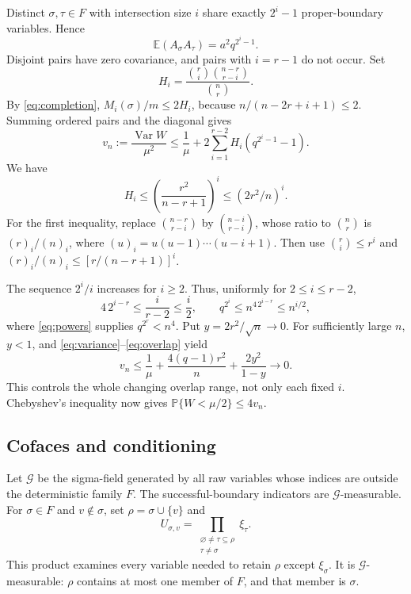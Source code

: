 \documentclass[11pt,a4paper]{article}
\newcommand{\E}{\mathbb E}
\newcommand{\Prob}{\mathbb P}
\newcommand{\Var}{\operatorname{Var}}
\begin{document}
Distinct $\sigma,\tau\in F$ with intersection size $i$ share exactly
$2^i-1$ proper-boundary variables. Hence
\[
\E(A_\sigma A_\tau)=a^2q^{2^i-1}.
\]
Disjoint pairs have zero covariance, and pairs with $i=r-1$ do not
occur. Set
\[
H_i=\frac{\binom ri\binom{n-r}{r-i}}{\binom nr}.
\]
By \eqref{eq:completion}, $M_i(\sigma)/m\le2H_i$, because
$n/(n-2r+i+1)\le2$. Summing ordered pairs and the diagonal gives
\begin{equation}\label{eq:variance}
v_n:=\frac{\Var W}{\mu^2}
\le\frac1\mu+2\sum_{i=1}^{r-2}H_i(q^{2^i-1}-1).
\end{equation}
We have
\begin{equation}\label{eq:overlap}
H_i\le\left(\frac{r^2}{n-r+1}\right)^i
\le(2r^2/n)^i.
\end{equation}
For the first inequality, replace $\binom{n-r}{r-i}$ by
$\binom{n-i}{r-i}$, whose ratio to $\binom nr$ is $(r)_i/(n)_i$,
where $(u)_i=u(u-1)\cdots(u-i+1)$. Then use
$\binom ri\le r^i$ and $(r)_i/(n)_i\le[r/(n-r+1)]^i$.

The sequence $2^i/i$ increases for $i\ge2$. Thus, uniformly for
$2\le i\le r-2$,
\[
4\,2^{i-r}\le\frac{i}{r-2}\le\frac i2,
\qquad q^{2^i}\le n^{4\,2^{i-r}}\le n^{i/2},
\]
where \eqref{eq:powers} supplies $q^{2^r}<n^4$.
Put $y=2r^2/\sqrt n\to0$. For sufficiently large $n$, $y<1$,
and \eqref{eq:variance}--\eqref{eq:overlap} yield
\begin{equation}\label{eq:smallvariance}
v_n\le\frac1\mu+\frac{4(q-1)r^2}{n}
+\frac{2y^2}{1-y}\longrightarrow0.
\end{equation}
This controls the whole changing overlap range, not only each fixed $i$.
Chebyshev's inequality now gives
$\Prob\{W<\mu/2\}\le4v_n$.

\subsection{Cofaces and conditioning}

Let $\mathcal G$ be the sigma-field generated by all raw variables whose indices are
outside the deterministic family $F$. The successful-boundary indicators
are $\mathcal G$-measurable. For $\sigma\in F$ and $v\notin\sigma$, set
$\rho=\sigma\cup\{v\}$ and
\[
U_{\sigma,v}
=\prod_{\substack{\varnothing\ne\tau\subseteq\rho\\\tau\ne\sigma}}\xi_\tau.
\]
This product examines every variable needed to retain $\rho$ except
$\xi_\sigma$. It is $\mathcal G$-measurable: $\rho$ contains at most
one member of $F$, and that member is $\sigma$.
\end{document}
